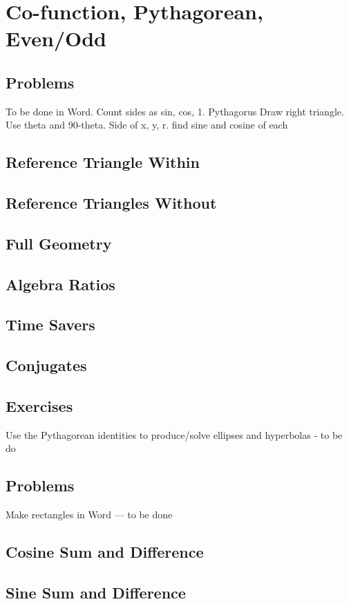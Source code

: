 \newpage
\section{Co-function, Pythagorean, Even/Odd}
\subsection{Problems}
To be done in Word.
Count sides as sin, cos, 1.  Pythagorus
Draw right triangle.  Use theta and 90-theta.  Side of x, y, r.  find sine and cosine of each
\newpage
\subsection{Reference Triangle Within}
\subsection{Reference Triangles Without}
\subsection{Full Geometry}
\subsection{Algebra Ratios}
\subsection{Time Savers}
\subsection{Conjugates}
\newpage
\subsection{Exercises}
Use the Pythagorean identities to produce/solve ellipses and hyperbolas - to be do


\newpage
{}
\subsection{Problems}
Make rectangles in Word --- to be done
\subsection{Cosine Sum and Difference}
\subsection{Sine Sum and Difference}
